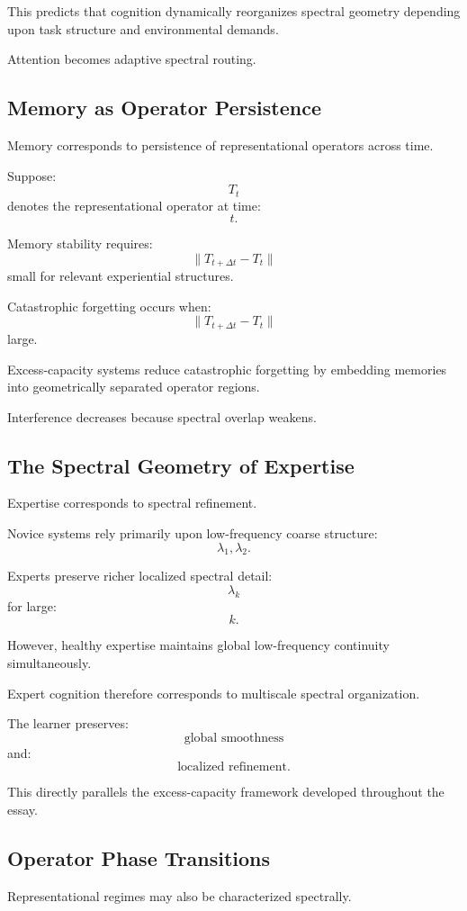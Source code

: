\documentclass[12pt,a4paper]{article}
\begin{document}
This predicts that cognition dynamically reorganizes spectral geometry depending upon task structure and environmental demands.

Attention becomes adaptive spectral routing.

\subsection{Memory as Operator Persistence}

Memory corresponds to persistence of representational operators across time.

Suppose:
\[
T_t
\]
denotes the representational operator at time:
\[
t.
\]

Memory stability requires:
\[
\|T_{t+\Delta t}-T_t\|
\]
small for relevant experiential structures.

Catastrophic forgetting occurs when:
\[
\|T_{t+\Delta t}-T_t\|
\]
large.

Excess-capacity systems reduce catastrophic forgetting by embedding memories into geometrically separated operator regions.

Interference decreases because spectral overlap weakens.

\subsection{The Spectral Geometry of Expertise}

Expertise corresponds to spectral refinement.

Novice systems rely primarily upon low-frequency coarse structure:
\[
\lambda_1,
\lambda_2.
\]

Experts preserve richer localized spectral detail:
\[
\lambda_k
\]
for large:
\[
k.
\]

However, healthy expertise maintains global low-frequency continuity simultaneously.

Expert cognition therefore corresponds to multiscale spectral organization.

The learner preserves:
\[
\text{global smoothness}
\]
and:
\[
\text{localized refinement}.
\]

This directly parallels the excess-capacity framework developed throughout the essay.

\subsection{Operator Phase Transitions}

Representational regimes may also be characterized spectrally.
\end{document}
